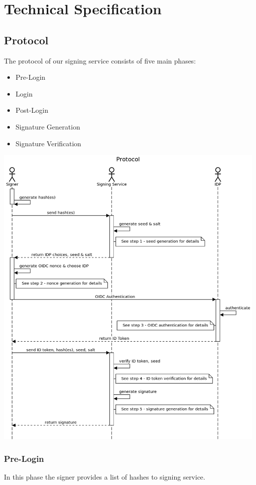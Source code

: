 \chapter{Technical Specification}
\section{Protocol}

The protocol of our signing service consists of five main phases:

\begin{itemize}
	\item Pre-Login
	\item Login
	\item Post-Login
	\item Signature Generation
	\item Signature Verification
\end{itemize}

\includegraphics[scale=0.5]{images/protocol_signature_generation_high_level.png}

\subsection{Pre-Login}
In this phase the signer provides a list of hashes to signing service. 

